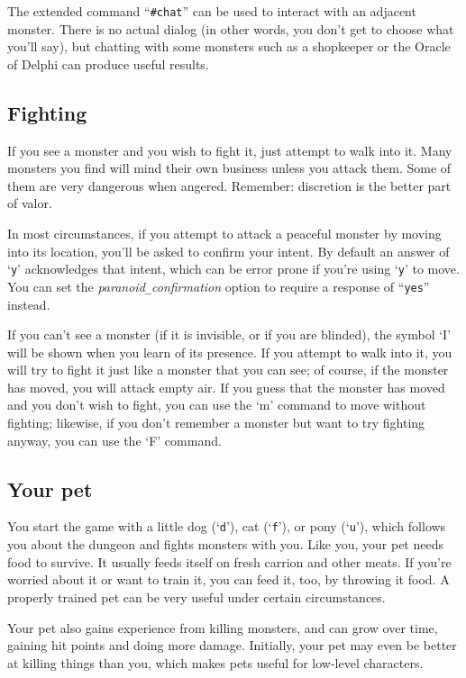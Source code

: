 The extended command ``{\tt \#chat}'' can be used to interact with an adjacent
monster.  There is no actual dialog (in other words, you don't get to
choose what you'll say), but chatting with some monsters such as a
shopkeeper or the Oracle of Delphi can produce useful results.

\subsection*{Fighting}

If you see a monster and you wish to fight it, just attempt to walk
into it.  Many monsters you find will mind their own business unless
you attack them.  Some of them are very dangerous when angered.
Remember:  discretion is the better part of valor.

In most circumstances, if you attempt to attack a peaceful monster by
moving into its location, you'll be asked to confirm your intent.  By 
default an answer of `{\tt y}' acknowledges that intent,
which can be error prone if you're using `{\tt y}' to move.  You can set the
{\it paranoid\verb+_+confirmation\/}
option to require a response of ``{\tt yes}'' instead.

If you can't see a monster (if it is invisible, or if you are blinded),
the symbol `I' will be shown when you learn of its presence.
If you attempt to walk into it, you will try to fight it just like
a monster that you can see; of course,
if the monster has moved, you will attack empty air.  If you guess
that the monster has moved and you don't wish to fight, you can use the `m'
command to move without fighting; likewise, if you don't remember a monster
but want to try fighting anyway, you can use the `F' command.

\subsection*{Your pet}

You start the game with a little dog (`{\tt d}'), cat (`{\tt f}'),
or pony (`{\tt u}'), which follows
you about the dungeon and fights monsters with you.  Like you, your
pet needs food to survive.  It usually feeds itself on fresh carrion
and other meats.  If you're worried about it or want to train it, you
can feed it, too, by throwing it food.  A properly trained pet can be
very useful under certain circumstances.

Your pet also gains experience from killing monsters, and can grow
over time, gaining hit points and doing more damage.  Initially, your
pet may even be better at killing things than you, which makes pets
useful for low-level characters.

